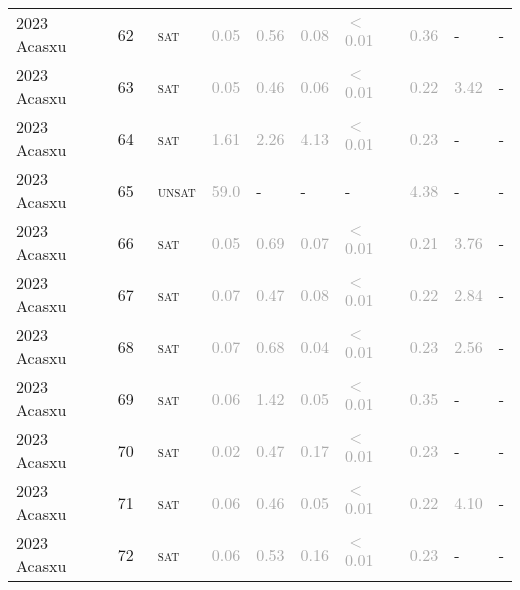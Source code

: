 \begin{center}
{\begin{longtable}{@{}llllllllll@{}}
2023 Acasxu & 62 & ~\textsc{sat} & \textcolor{darkgray}{0.05} & \textcolor{darkgray}{0.56} & \textcolor{darkgray}{0.08} & \textcolor{darkgray}{$<$0.01} & \textcolor{darkgray}{0.36} & - & - \\
2023 Acasxu & 63 & ~\textsc{sat} & \textcolor{darkgray}{0.05} & \textcolor{darkgray}{0.46} & \textcolor{darkgray}{0.06} & \textcolor{darkgray}{$<$0.01} & \textcolor{darkgray}{0.22} & \textcolor{darkgray}{3.42} & - \\
2023 Acasxu & 64 & ~\textsc{sat} & \textcolor{darkgray}{1.61} & \textcolor{darkgray}{2.26} & \textcolor{darkgray}{4.13} & \textcolor{darkgray}{$<$0.01} & \textcolor{darkgray}{0.23} & - & - \\
2023 Acasxu & 65 & ~\textsc{unsat} & \textcolor{darkgray}{59.0} & - & - & - & \textcolor{darkgray}{4.38} & - & - \\
2023 Acasxu & 66 & ~\textsc{sat} & \textcolor{darkgray}{0.05} & \textcolor{darkgray}{0.69} & \textcolor{darkgray}{0.07} & \textcolor{darkgray}{$<$0.01} & \textcolor{darkgray}{0.21} & \textcolor{darkgray}{3.76} & - \\
2023 Acasxu & 67 & ~\textsc{sat} & \textcolor{darkgray}{0.07} & \textcolor{darkgray}{0.47} & \textcolor{darkgray}{0.08} & \textcolor{darkgray}{$<$0.01} & \textcolor{darkgray}{0.22} & \textcolor{darkgray}{2.84} & - \\
2023 Acasxu & 68 & ~\textsc{sat} & \textcolor{darkgray}{0.07} & \textcolor{darkgray}{0.68} & \textcolor{darkgray}{0.04} & \textcolor{darkgray}{$<$0.01} & \textcolor{darkgray}{0.23} & \textcolor{darkgray}{2.56} & - \\
2023 Acasxu & 69 & ~\textsc{sat} & \textcolor{darkgray}{0.06} & \textcolor{darkgray}{1.42} & \textcolor{darkgray}{0.05} & \textcolor{darkgray}{$<$0.01} & \textcolor{darkgray}{0.35} & - & - \\
2023 Acasxu & 70 & ~\textsc{sat} & \textcolor{darkgray}{0.02} & \textcolor{darkgray}{0.47} & \textcolor{darkgray}{0.17} & \textcolor{darkgray}{$<$0.01} & \textcolor{darkgray}{0.23} & - & - \\
2023 Acasxu & 71 & ~\textsc{sat} & \textcolor{darkgray}{0.06} & \textcolor{darkgray}{0.46} & \textcolor{darkgray}{0.05} & \textcolor{darkgray}{$<$0.01} & \textcolor{darkgray}{0.22} & \textcolor{darkgray}{4.10} & - \\
2023 Acasxu & 72 & ~\textsc{sat} & \textcolor{darkgray}{0.06} & \textcolor{darkgray}{0.53} & \textcolor{darkgray}{0.16} & \textcolor{darkgray}{$<$0.01} & \textcolor{darkgray}{0.23} & - & - \\

\end{longtable}}
\end{center}
